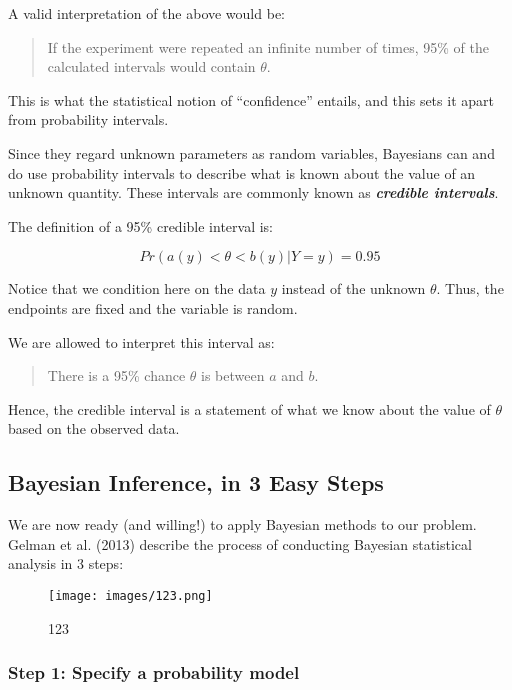 \documentclass[11pt]{article}
\makeatletter
\def\maxwidth{\ifdim\Gin@nat@width>\linewidth\linewidth
    \else\Gin@nat@width\fi}
\let\Oldincludegraphics\includegraphics
\renewcommand{\includegraphics}[1]{\Oldincludegraphics[width=.8\maxwidth]{#1}}
\makeatother
\begin{document}
A valid interpretation of the above would be:

\begin{quote}
If the experiment were repeated an infinite number of times, 95\% of the
calculated intervals would contain \(\theta\).
\end{quote}

This is what the statistical notion of ``confidence'' entails, and this
sets it apart from probability intervals.

Since they regard unknown parameters as random variables, Bayesians can
and do use probability intervals to describe what is known about the
value of an unknown quantity. These intervals are commonly known as
\textbf{\emph{credible intervals}}.

The definition of a 95\% credible interval is:

\[Pr(a(y) < \theta < b(y) | Y=y) = 0.95\]

Notice that we condition here on the data \(y\) instead of the unknown
\(\theta\). Thus, the endpoints are fixed and the variable is random.

We are allowed to interpret this interval as:

\begin{quote}
There is a 95\% chance \(\theta\) is between \(a\) and \(b\).
\end{quote}

Hence, the credible interval is a statement of what we know about the
value of \(\theta\) based on the observed data.

    \hypertarget{bayesian-inference-in-3-easy-steps}{%
\subsection{Bayesian Inference, in 3 Easy
Steps}\label{bayesian-inference-in-3-easy-steps}}

We are now ready (and willing!) to apply Bayesian methods to our
problem. Gelman et al. (2013) describe the process of conducting
Bayesian statistical analysis in 3 steps:

\begin{figure}
\centering
\texttt{[image: images/123.png]}
\caption{123}
\end{figure}

\hypertarget{step-1-specify-a-probability-model}{%
\subsubsection{Step 1: Specify a probability
model}\label{step-1-specify-a-probability-model}}
\end{document}
